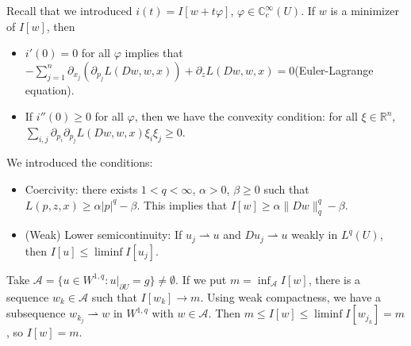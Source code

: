 \documentclass[12pt]{scrartcl}
\newcommand{\R}{\mathbb{R}}
\newcommand{\C}{\mathbb C}
\newcommand{\<}{\langle}
\renewcommand{\>}{\rangle}
\let \phi \varphi
\let \mc \mathcal
\let \weakto \rightharpoonup
\begin{document}
Recall that we introduced $i(t) = I[w + t\phi]$, $\phi \in \C_c^\infty(U)$.  If $w$ is a minimizer of $I[w]$, then
\begin{itemize}
\item $i'(0) = 0$ for all $\phi$ implies that $-\sum_{j=1}^n \partial_{x_j} (\partial_{p_j}L(Dw, w, x)) + \partial_zL(Dw, w, x) = 0$(Euler-Lagrange equation).
\item If $i''(0) \ge 0$ for all $\phi$, then we have the convexity condition: for all $\xi \in \R^n$, $\sum_{i, j} \partial_{p_i} \partial_{p_j} L(Dw, w, x)\xi_i \xi_j \ge 0$.
\end{itemize}
We introduced the conditions:
\begin{itemize}
\item Coercivity: there exists $1 < q < \infty$, $\alpha > 0$, $\beta \ge 0$ such that $L(p, z, x) \ge \alpha |p|^q - \beta$.  This implies that $I[w] \ge \alpha\|Dw\|_q^q - \beta$.
\item (Weak) Lower semicontinuity: If $u_j \weakto u$ and $Du_j \weakto u$ weakly in $L^q(U)$, then $I[u] \le \liminf I[u_j]$.
\end{itemize}

\begin{remark} Take $\mc A = \{u \in W^{1, q}: u\vert_{\partial U} = g\} \ne \emptyset$.  If we put $m = \inf_{\mc A} I[w]$, there is a sequence $w_k \in \mc A$ such that $I[w_k] \to m$.  Using weak compactness, we have a subsequence $w_{k_j} \weakto w$ in $W^{1, q}$ with $w \in \mc A$.  Then $m \le I[w] \le \liminf I[w_{j_k}]= m$, so $I[w] = m$.
\end{remark}
\end{document}
